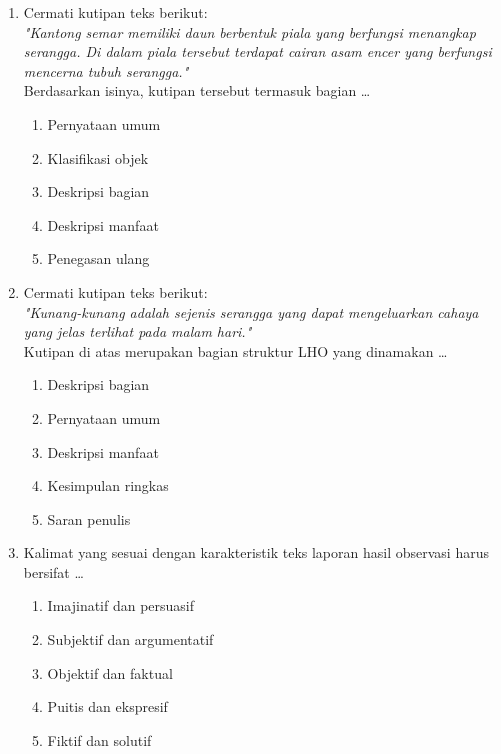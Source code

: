 \documentclass[12pt,a4paper]{article}
\begin{document}
\begin{enumerate}[leftmargin=*]
\item Cermati kutipan teks berikut:\\
\textit{"Kantong semar memiliki daun berbentuk piala yang berfungsi menangkap serangga. Di dalam piala tersebut terdapat cairan asam encer yang berfungsi mencerna tubuh serangga."}\\
Berdasarkan isinya, kutipan tersebut termasuk bagian \dots
    \begin{enumerate}[label=\alph*.]
        \item Pernyataan umum
        \item Klasifikasi objek
        \item Deskripsi bagian
        \item Deskripsi manfaat
        \item Penegasan ulang
    \end{enumerate}

\item Cermati kutipan teks berikut:\\
\textit{"Kunang-kunang adalah sejenis serangga yang dapat mengeluarkan cahaya yang jelas terlihat pada malam hari."}\\
Kutipan di atas merupakan bagian struktur LHO yang dinamakan \dots
    \begin{enumerate}[label=\alph*.]
        \item Deskripsi bagian
        \item Pernyataan umum
        \item Deskripsi manfaat
        \item Kesimpulan ringkas
        \item Saran penulis
    \end{enumerate}

\item Kalimat yang sesuai dengan karakteristik teks laporan hasil observasi harus bersifat \dots
    \begin{enumerate}[label=\alph*.]
        \item Imajinatif dan persuasif
        \item Subjektif dan argumentatif
        \item Objektif dan faktual
        \item Puitis dan ekspresif
        \item Fiktif dan solutif
    \end{enumerate}


\end{enumerate}
\end{document}
